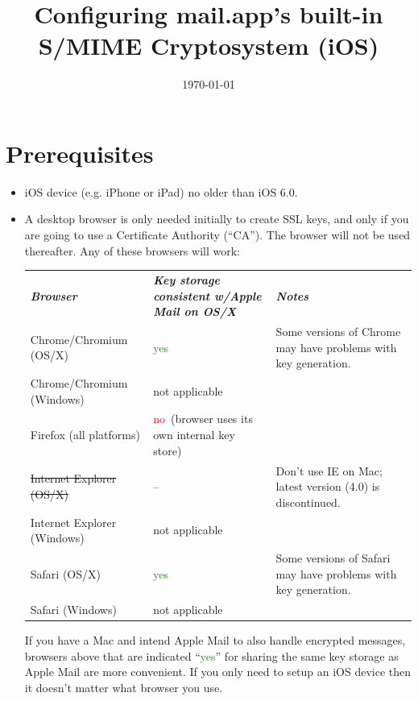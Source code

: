 \documentclass[pdftex,12pt,titlepage=false]{scrartcl}
\title{\rmfamily Configuring mail.app's built-in S/MIME Cryptosystem (iOS)}
\date{\rmfamily\today}
\newcommand{\yesgood}{\textcolor{ForestGreen}{yes}}
\newcommand{\nobad}{\textcolor{red}{no}}
\newcommand{\keystoreintl}{\tiny(browser uses its own internal key store)}
\begin{document}
\maketitle

\tableofcontents

\section{Prerequisites}
\begin{itemize}
\item iOS device (e.g. iPhone or iPad) no older than iOS 6.0.
\item A desktop browser is only needed initially to create SSL keys,
  and only if you are going to use a Certificate Authority (``CA'').
  The browser will not be used thereafter.  Any of these browsers will
  work:
  
    \begin{tabular}{lp{50mm}>{\small}p{}}
    \textsl{\textbf{Browser}}          & \textsl{\textbf{Key storage consistent w/Apple Mail on OS/X}} & \textsl{\textbf{Notes}}\\
    Chrome/Chromium \tiny(OS/X)        & \yesgood                & Some versions of Chrome may have problems with key generation.\\
    \hline
    Chrome/Chromium \tiny(Windows)     & not applicable          & \\
    \hline
    Firefox \tiny(all platforms)       & \nobad\ \keystoreintl   & \\
    \hline
    \st{Internet Explorer \tiny(OS/X)} & --                      & Don't use IE on Mac; latest version (4.0) is discontinued.\\
    \hline
    Internet Explorer \tiny(Windows)   & not applicable          & \\
    \hline
    Safari \tiny(OS/X)                 & \yesgood                & Some versions of Safari may have problems with key generation.\\
    \hline
    Safari \tiny(Windows)              & not applicable          & \\
  \end{tabular}

  If you have a Mac and intend Apple Mail to also handle encrypted
  messages, browsers above that are indicated ``\yesgood'' for sharing
  the same key storage as Apple Mail are more convenient.  If you only
  need to setup an iOS device then it doesn't matter what browser you
  use.

\end{itemize}
\end{document}
